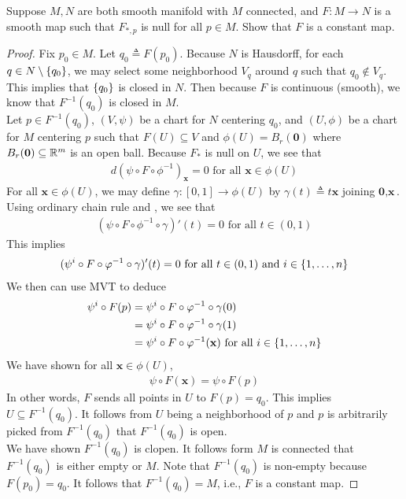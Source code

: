 \documentclass{report}
\begin{document}
\begin{question}{}{}
Suppose $M,N$ are both smooth manifold with  $M$ connected, and  $F:M\rightarrow N$ is a smooth map such that $F_{*,p}$ is null for all $p\in  M$. Show that $F$ is a constant map. 
\end{question}
\begin{proof}
Fix $p_0\in M$. Let $q_0\triangleq F(p_0)$. Because $N$ is Hausdorff, for each $q \in N\setminus \{ q_0 \}$, we may select some neighborhood $V_q$ around $q$ such that $q_0\not\in V_q$. This implies that $\{ q_0 \}$ is closed in $N$.  Then because $F$ is continuous  (smooth), we know that $F^{-1}(q_0)$ is closed in $M$. \\

Let $p\in F^{-1}(q_0)$, $(V,\psi)$ be a chart for $N$ centering  $q_0$, and $(U,\phi)$ be a chart for $M$ centering  $p$ such that  $F(U)\subseteq V$ and $\phi (U)=B_r(\textbf{0})$ where $B_r(\textbf{0})\subseteq \mathbb{R}^m$ is an open ball. Because $F_*$ is null on $U$, we see that
\begin{align}
\label{mi3}
d(\psi \circ F\circ \phi^{-1})_{\textbf{x}}=0\text{ for all }\textbf{x}\in \phi (U)
\end{align}
For all $\textbf{x}\in \phi (U)$, we may define $\gamma :[0,1]\rightarrow \phi(U)$ by $\gamma (t)\triangleq t\textbf{x}$ joining $\textbf{0},\textbf{x}$. Using ordinary chain rule and , we see that 
\begin{align*}
(\psi \circ F\circ \phi ^{-1} \circ \gamma )'(t)=0\text{ for all }t\in (0,1)
\end{align*}
This implies 
\begin{align*}
  (\psi^i \circ F \circ \varphi^{-1}\circ \gamma )'(t)=0\text{ for all }t\in (0,1)\text{ and }i\in \{ 1,\dots, n \}
\end{align*}
We then can use MVT to deduce 
\begin{align*}
\psi^i \circ F(p)&= \psi^i \circ F \circ \varphi^{-1}\circ \gamma (0)\\
&=\psi^i \circ F \circ \varphi ^{-1}\circ \gamma (1)\\
&=\psi^i \circ F \circ \varphi^{-1} (\textbf{x})\text{ for all }i \in \{ 1,\dots ,n \}
\end{align*}
We have shown for all $\textbf{x}\in \phi (U)$, 
\begin{align*}
\psi \circ F(\textbf{x})=\psi \circ F(p)
\end{align*}
In other words, $F$ sends all points in $U$  to $F(p)=q_0$. This implies $U\subseteq F^{-1}(q_0)$. It follows from $U$ being a neighborhood of $p$ and  $p$ is arbitrarily picked from  $F^{-1}(q_0)$ that $F^{-1}(q_0)$ is open. \\

We have shown $F^{-1}(q_0)$ is clopen. It follows form $M$ is connected that  $F^{-1}(q_0)$ is either empty or $M$. Note that  $F^{-1}(q_0)$ is non-empty because $F(p_0)=q_0$. It follows that $F^{-1}(q_0)=M$, i.e., $F$ is a constant map.   
\end{proof}
\end{document}
